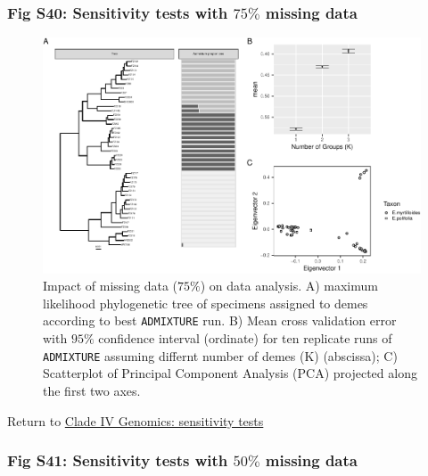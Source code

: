 \documentclass[
  11pt,
]{article}
\begin{document}
\hypertarget{fig-s40-sensitivity-tests-with-75-missing-data}{%
\subsubsection{\texorpdfstring{Fig S40: Sensitivity tests with \(75\%\) missing data}{Fig S40: Sensitivity tests with 75\textbackslash\% missing data}}\label{fig-s40-sensitivity-tests-with-75-missing-data}}

\begin{figure}
\includegraphics{Supplementary_Material_files/figure-latex/cladeIVgenomicSensitivityAnalysesLargestplots-1} \caption{Impact of missing data ($75\%$) on data analysis. A) maximum likelihood phylogenetic tree of specimens assigned to demes according to best \texttt{ADMIXTURE} run. B) Mean cross validation error with $95\%$ confidence interval (ordinate) for ten replicate runs of \texttt{ADMIXTURE} assuming differnt number of demes (K) (abscissa); C) Scatterplot of Principal Component Analysis (PCA) projected along the first two axes.}\label{fig:cladeIVgenomicSensitivityAnalysesLargestplots}
\end{figure}

Return to \protect\hyperlink{sensitivity-tests-3}{Clade IV Genomics: sensitivity tests}
\pagebreak

\hypertarget{fig-s41-sensitivity-tests-with-50-missing-data}{%
\subsubsection{\texorpdfstring{Fig S41: Sensitivity tests with \(50\%\) missing data}{Fig S41: Sensitivity tests with 50\textbackslash\% missing data}}\label{fig-s41-sensitivity-tests-with-50-missing-data}}
\end{document}
